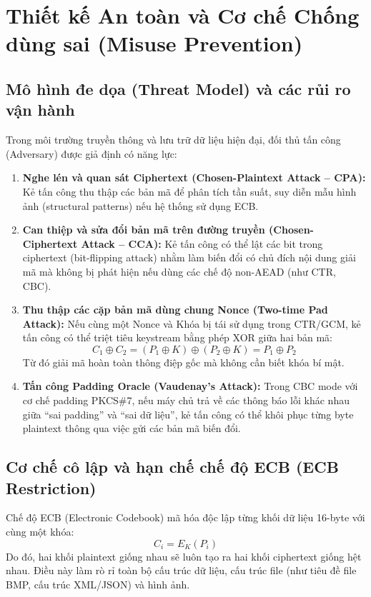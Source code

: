 \documentclass[12pt, a4paper]{report}
\begin{document}
\section{Thiết kế An toàn và Cơ chế Chống dùng sai (Misuse Prevention)}
\label{sec:security}

\subsection{Mô hình đe dọa (Threat Model) và các rủi ro vận hành}
Trong môi trường truyền thông và lưu trữ dữ liệu hiện đại, đối thủ tấn công (Adversary) được giả định có năng lực:
\begin{enumerate}
    \item \textbf{Nghe lén và quan sát Ciphertext (Chosen-Plaintext Attack -- CPA):} Kẻ tấn công thu thập các bản mã để phân tích tần suất, suy diễn mẫu hình ảnh (structural patterns) nếu hệ thống sử dụng ECB.
    \item \textbf{Can thiệp và sửa đổi bản mã trên đường truyền (Chosen-Ciphertext Attack -- CCA):} Kẻ tấn công có thể lật các bit trong ciphertext (bit-flipping attack) nhằm làm biến đổi có chủ đích nội dung giải mã mà không bị phát hiện nếu dùng các chế độ non-AEAD (như CTR, CBC).
    \item \textbf{Thu thập các cặp bản mã dùng chung Nonce (Two-time Pad Attack):} Nếu cùng một Nonce và Khóa bị tái sử dụng trong CTR/GCM, kẻ tấn công có thể triệt tiêu keystream bằng phép XOR giữa hai bản mã:
    \[ C_1 \oplus C_2 = (P_1 \oplus K) \oplus (P_2 \oplus K) = P_1 \oplus P_2 \]
    Từ đó giải mã hoàn toàn thông điệp gốc mà không cần biết khóa bí mật.
    \item \textbf{Tấn công Padding Oracle (Vaudenay's Attack):} Trong CBC mode với cơ chế padding PKCS\#7, nếu máy chủ trả về các thông báo lỗi khác nhau giữa ``sai padding'' và ``sai dữ liệu'', kẻ tấn công có thể khôi phục từng byte plaintext thông qua việc gửi các bản mã biến đổi.
\end{enumerate}

\subsection{Cơ chế cô lập và hạn chế chế độ ECB (ECB Restriction)}
Chế độ ECB (Electronic Codebook) mã hóa độc lập từng khối dữ liệu 16-byte với cùng một khóa:
\[ C_i = E_K(P_i) \]
Do đó, hai khối plaintext giống nhau sẽ luôn tạo ra hai khối ciphertext giống hệt nhau. Điều này làm rò rỉ toàn bộ cấu trúc dữ liệu, cấu trúc file (như tiêu đề file BMP, cấu trúc XML/JSON) và hình ảnh.
\end{document}
